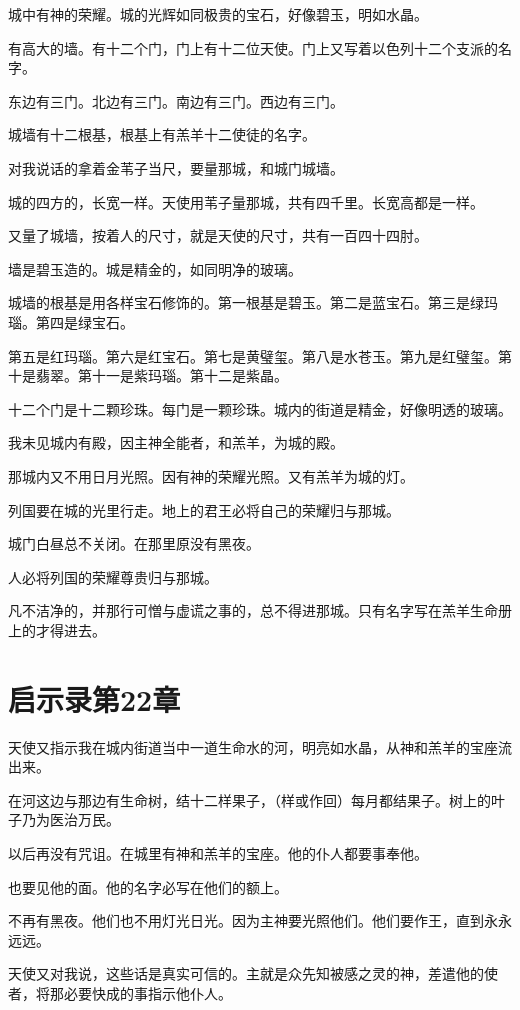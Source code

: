 \documentclass[12pt,oneside]{book}
\begin{document}
城中有神的荣耀。城的光辉如同极贵的宝石，好像碧玉，明如水晶。

有高大的墙。有十二个门，门上有十二位天使。门上又写着以色列十二个支派的名字。

东边有三门。北边有三门。南边有三门。西边有三门。

城墙有十二根基，根基上有羔羊十二使徒的名字。

对我说话的拿着金苇子当尺，要量那城，和城门城墙。

城的四方的，长宽一样。天使用苇子量那城，共有四千里。长宽高都是一样。

又量了城墙，按着人的尺寸，就是天使的尺寸，共有一百四十四肘。

墙是碧玉造的。城是精金的，如同明净的玻璃。

城墙的根基是用各样宝石修饰的。第一根基是碧玉。第二是蓝宝石。第三是绿玛瑙。第四是绿宝石。

第五是红玛瑙。第六是红宝石。第七是黄璧玺。第八是水苍玉。第九是红璧玺。第十是翡翠。第十一是紫玛瑙。第十二是紫晶。

十二个门是十二颗珍珠。每门是一颗珍珠。城内的街道是精金，好像明透的玻璃。

我未见城内有殿，因主神全能者，和羔羊，为城的殿。

那城内又不用日月光照。因有神的荣耀光照。又有羔羊为城的灯。

列国要在城的光里行走。地上的君王必将自己的荣耀归与那城。

城门白昼总不关闭。在那里原没有黑夜。

人必将列国的荣耀尊贵归与那城。

凡不洁净的，并那行可憎与虚谎之事的，总不得进那城。只有名字写在羔羊生命册上的才得进去。

\chapter{启示录第22章}
天使又指示我在城内街道当中一道生命水的河，明亮如水晶，从神和羔羊的宝座流出来。

在河这边与那边有生命树，结十二样果子，（样或作回）每月都结果子。树上的叶子乃为医治万民。

以后再没有咒诅。在城里有神和羔羊的宝座。他的仆人都要事奉他。

也要见他的面。他的名字必写在他们的额上。

不再有黑夜。他们也不用灯光日光。因为主神要光照他们。他们要作王，直到永永远远。

天使又对我说，这些话是真实可信的。主就是众先知被感之灵的神，差遣他的使者，将那必要快成的事指示他仆人。
\end{document}
